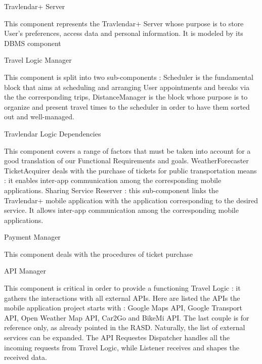 \documentclass[12pt, a4paper]{article}
\begin{document}
\begin{description}
Travlendar+ Server

This component represents the Travlendar+ Server whose  purpose is to store User's preferences, access data and personal information. It is modeled by its DBMS component

Travel Logic Manager

This component is split into two sub-components : Scheduler is the fundamental block that aims at scheduling and arranging User appointments and breaks via the the corresponding trips, DistanceManager is the block whose purpose is to organize and present travel times to the scheduler in order to have them sorted out and well-managed.

Travlendar Logic Dependencies

This component covers a range of factors that must be taken into account for a good translation of our Functional Requirements and goals. WeatherForecaster 
TicketAcquirer deals with the purchase of tickets for public transportation means : it enables inter-app communication among the corresponding mobile applications.
Sharing Service Reserver : this sub-component links the Travlendar+ mobile application with the application corresponding to the desired service. It allows inter-app communication among the corresponding mobile applications. 

Payment Manager

This component deals with the procedures of ticket purchase

API Manager

This component is critical in order to provide a functioning Travel Logic : it gathers the interactions with all external APIs. Here are listed the APIs the mobile application project starts with : Google Maps API, Google Transport API, Open Weather Map API, Car2Go and BikeMi API. The last couple is for reference only, as already pointed in the RASD. Naturally, the list of external services can be expanded.
The API Requestes Dispatcher handles all the incoming requests from Travel Logic, while Listener receives and shapes the received data.



\end{description}
 
\end{document}
